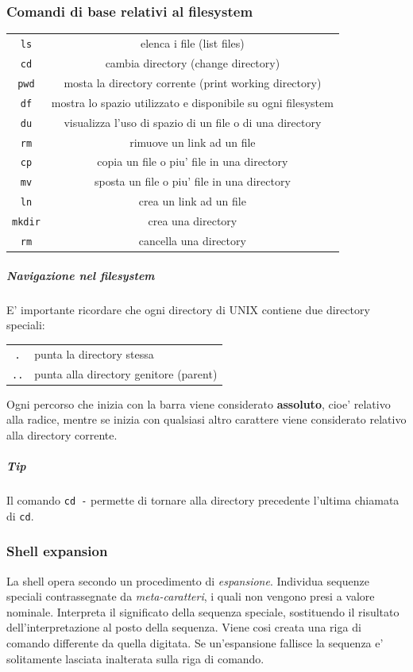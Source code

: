 \subsubsection{Comandi di base relativi al filesystem} 
\begin{center}
	\begin{tabular}{c|c}
		\hline
		\texttt{ls} & elenca i file (list files)\\ 
		\texttt{cd} & cambia directory (change directory)\\ 
		\texttt{pwd} & mosta la directory corrente (print working directory)\\ 
		\texttt{df} & mostra lo spazio utilizzato e disponibile su ogni filesystem\\ 
		\texttt{du} & visualizza l'uso di spazio di un file o di una directory\\ 
		\texttt{rm} & rimuove un link ad un file \\ 
		\texttt{cp} & copia un file o piu' file in una directory \\ 
		\texttt{mv} & sposta un file o piu' file in una directory \\ 
		\texttt{ln} & crea un link ad un file \\ 
		\texttt{mkdir} & crea una directory \\ 
		\texttt{rm} & cancella una directory \\ 
		\hline
	\end{tabular}
\end{center}
\noindent
\subparagraph{Navigazione nel filesystem}
E' importante ricordare che ogni directory di UNIX contiene due directory speciali:
\begin{center}
	\begin{tabular}{cl}
		\texttt{.} & punta la directory stessa \\ 
		\texttt{..} & punta alla directory genitore (parent) \\ 
	\end{tabular}
\end{center}
Ogni percorso che inizia con la barra viene considerato \textbf{assoluto}, cioe' relativo
alla radice, mentre se inizia con qualsiasi altro carattere viene considerato relativo
alla directory corrente.\\

\subparagraph{\textbf{Tip}}
	Il comando \texttt{cd -} permette di tornare alla directory precedente l'ultima chiamata di \texttt{cd}.

\subsubsection{Shell expansion}
La shell opera secondo un procedimento di \emph{espansione}. Individua sequenze speciali
contrassegnate da \emph{meta-caratteri}, i quali non vengono presi a valore nominale.
Interpreta il significato della sequenza speciale, sostituendo il risultato 
dell'interpretazione al posto della sequenza. Viene cosi creata una riga di comando
differente da quella digitata. Se un'espansione fallisce la sequenza e' solitamente
lasciata inalterata sulla riga di comando.\\

